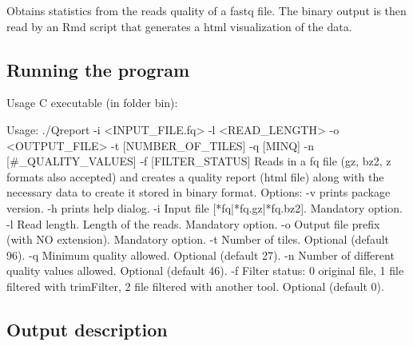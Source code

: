 Obtains statistics from the reads quality of a fastq file. The binary output is then read by an {\ttfamily Rmd} script that generates a html visualization of the data.

\subsection*{Running the program}

Usage {\ttfamily C} executable (in folder {\ttfamily bin})\+:


\begin{DoxyCode}
Usage: ./Qreport -i <INPUT\_FILE.fq> -l <READ\_LENGTH>
       -o <OUTPUT\_FILE> -t [NUMBER\_OF\_TILES] -q [MINQ]
       -n [#\_QUALITY\_VALUES] -f [FILTER\_STATUS]
Reads in a fq file (gz, bz2, z formats also accepted) and creates a
quality report (html file) along with the necessary data to create it
stored in binary format.
Options: 
 -v prints package version.
 -h prints help dialog.
 -i Input file [*fq|*fq.gz|*fq.bz2]. Mandatory option.
 -l Read length. Length of the reads. Mandatory option.
 -o Output file prefix (with NO extension). Mandatory option.
 -t Number of tiles. Optional (default 96).
 -q Minimum quality allowed. Optional (default 27).
 -n Number of different quality values allowed. Optional (default 46).
 -f Filter status: 0 original file, 1 file filtered with trimFilter,
    2 file filtered with another tool. Optional (default 0).
\end{DoxyCode}


\subsection*{Output description}


